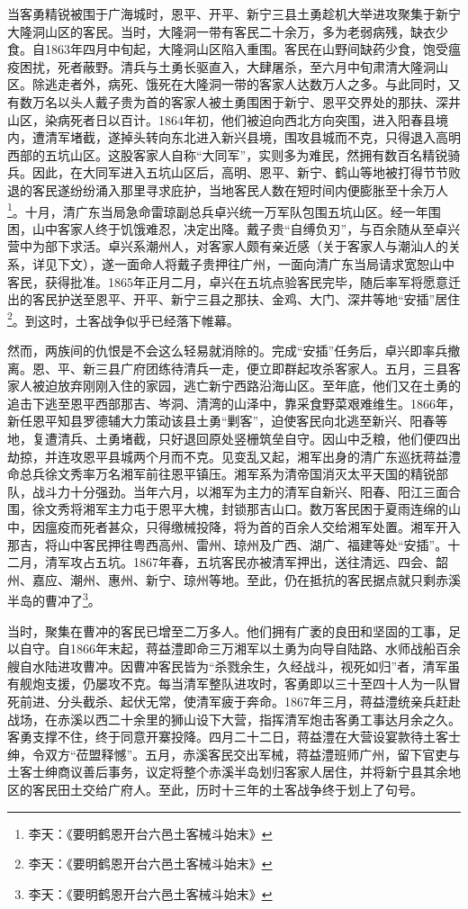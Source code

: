 当客勇精锐被围于广海城时，恩平、开平、新宁三县土勇趁机大举进攻聚集于新宁大隆洞山区的客民。当时，大隆洞一带有客民二十余万，多为老弱病残，缺衣少食。自1863年四月中旬起，大隆洞山区陷入重围。客民在山野间缺药少食，饱受瘟疫困扰，死者蔽野。清兵与土勇长驱直入，大肆屠杀，至六月中旬肃清大隆洞山区。除逃走者外，病死、饿死在大隆洞一带的客家人达数万人之多。与此同时，又有数万名以头人戴子贵为首的客家人被土勇围困于新宁、恩平交界处的那扶、深井山区，染病死者日以百计。1864年初，他们被迫向西北方向突围，进入阳春县境内，遭清军堵截，遂掉头转向东北进入新兴县境，围攻县城而不克，只得退入高明西部的五坑山区。这股客家人自称“大同军”，实则多为难民，然拥有数百名精锐骑兵。因此，在大同军进入五坑山区后，高明、恩平、新宁、鹤山等地被打得节节败退的客民遂纷纷涌入那里寻求庇护，当地客民人数在短时间内便膨胀至十余万人\footnote{李天：《要明鹤恩开台六邑土客械斗始末》}。十月，清广东当局急命雷琼副总兵卓兴统一万军队包围五坑山区。经一年围困，山中客家人终于饥饿难忍，决定出降。戴子贵“自缚负刃”，与百余随从至卓兴营中为部下求活。卓兴系潮州人，对客家人颇有亲近感（关于客家人与潮汕人的关系，详见下文），遂一面命人将戴子贵押往广州，一面向清广东当局请求宽恕山中客民，获得批准。1865年正月二月，卓兴在五坑点验客民完毕，随后率军将愿意迁出的客民护送至恩平、开平、新宁三县之那扶、金鸡、大门、深井等地“安插”居住\footnote{李天：《要明鹤恩开台六邑土客械斗始末》}。到这时，土客战争似乎已经落下帷幕。

然而，两族间的仇恨是不会这么轻易就消除的。完成“安插”任务后，卓兴即率兵撤离。恩、平、新三县广府团练待清兵一走，便立即群起攻杀客家人。五月，三县客家人被迫放弃刚刚入住的家园，逃亡新宁西路沿海山区。至年底，他们又在土勇的追击下逃至恩平西部那吉、岑洞、清湾的山泽中，靠采食野菜艰难维生。1866年，新任恩平知县罗德辅大力策动该县土勇“剿客”，迫使客民向北逃至新兴、阳春等地，复遭清兵、土勇堵截，只好退回原处竖栅筑垒自守。因山中乏粮，他们便四出劫掠，并连攻恩平县城两个月而不克。见变乱又起，湘军出身的清广东巡抚蒋益澧命总兵徐文秀率万名湘军前往恩平镇压。湘军系为清帝国消灭太平天国的精锐部队，战斗力十分强劲。当年六月，以湘军为主力的清军自新兴、阳春、阳江三面合围，徐文秀将湘军主力屯于恩平大槐，封锁那吉山口。数万客民困于夏雨连绵的山中，因瘟疫而死者甚众，只得缴械投降，将为首的百余人交给湘军处置。湘军开入那吉，将山中客民押往粤西高州、雷州、琼州及广西、湖广、福建等处“安插”。十二月，清军攻占五坑。1867年春，五坑客民亦被清军押出，送往清远、四会、韶州、嘉应、潮州、惠州、新宁、琼州等地。至此，仍在抵抗的客民据点就只剩赤溪半岛的曹冲了\footnote{李天：《要明鹤恩开台六邑土客械斗始末》}。

当时，聚集在曹冲的客民已增至二万多人。他们拥有广袤的良田和坚固的工事，足以自守。自1866年末起，蒋益澧即命三万湘军以土勇为向导自陆路、水师战船百余艘自水陆进攻曹冲。因曹冲客民皆为“杀戮余生，久经战斗，视死如归”者，清军虽有舰炮支援，仍屡攻不克。每当清军整队进攻时，客勇即以三十至四十人为一队冒死前进、分头截杀、起伏无常，使清军疲于奔命。1867年三月，蒋益澧统亲兵赶赴战场，在赤溪以西二十余里的狮山设下大营，指挥清军炮击客勇工事达月余之久。客勇支撑不住，终于同意开寨投降。四月二十二日，蒋益澧在大营设宴款待土客士绅，令双方“莅盟释憾”。五月，赤溪客民交出军械，蒋益澧班师广州，留下官吏与土客士绅商议善后事务，议定将整个赤溪半岛划归客家人居住，并将新宁县其余地区的客民田土交给广府人。至此，历时十三年的土客战争终于划上了句号。

